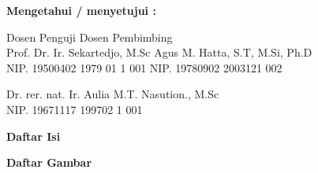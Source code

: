 \documentclass[12pt]{article}
\begin{document}
	\vspace{20pt}
	
	\begin{center}
		\textbf{Mengetahui / menyetujui :}
	\end{center}

	
	\begin{center}
		Dosen Penguji \hspace{150pt} Dosen Pembimbing \\
		Prof. Dr. Ir. Sekartedjo, M.Sc \hspace{75pt} Agus M. Hatta, S.T, M.Si, Ph.D \\
		NIP. 19500402 1979 01 1 001 \hspace{85pt} NIP. 19780902 2003121 002 \\
	\end{center}

	\vspace{75pt}	
	
	\begin{flushleft}
		Dr. rer. nat. Ir. Aulia M.T. Nasution., M.Sc \\
		NIP. 19671117 199702 1 001
	\end{flushleft}


\newpage
\thispagestyle{plain}
\mbox{}


\newpage

	\begin{center}
		\textbf{{\large Daftar Isi}}
	\end{center}
	
	\tableofcontents




\newpage

	\begin{center}
		\textbf{{\large Daftar Gambar}}
	\end{center}

	\listoffigures

\end{document}
